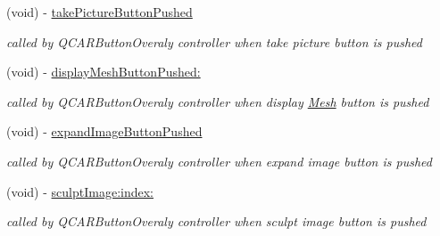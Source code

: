 \begin{DoxyCompactItemize}
\item 
\hypertarget{interface_q_c_a_r_view_controller_a5c1af65246b760a45b54d40fc888d302}{
(void) -\/ \hyperlink{interface_q_c_a_r_view_controller_a5c1af65246b760a45b54d40fc888d302}{take\-Picture\-Button\-Pushed}}
\label{interface_q_c_a_r_view_controller_a5c1af65246b760a45b54d40fc888d302}

\begin{DoxyCompactList}\small\item\em called by \-Q\-C\-A\-R\-Button\-Overaly controller when take picture button is pushed \end{DoxyCompactList}\item 
\hypertarget{interface_q_c_a_r_view_controller_a689ee8113148caf0deb078c995ac619e}{
(void) -\/ \hyperlink{interface_q_c_a_r_view_controller_a689ee8113148caf0deb078c995ac619e}{display\-Mesh\-Button\-Pushed\-:}}
\label{interface_q_c_a_r_view_controller_a689ee8113148caf0deb078c995ac619e}

\begin{DoxyCompactList}\small\item\em called by \-Q\-C\-A\-R\-Button\-Overaly controller when display \hyperlink{class_mesh}{\-Mesh} button is pushed \end{DoxyCompactList}\item 
\hypertarget{interface_q_c_a_r_view_controller_a4a666eb1ae98bee2d084c26f99b472c0}{
(void) -\/ \hyperlink{interface_q_c_a_r_view_controller_a4a666eb1ae98bee2d084c26f99b472c0}{expand\-Image\-Button\-Pushed}}
\label{interface_q_c_a_r_view_controller_a4a666eb1ae98bee2d084c26f99b472c0}

\begin{DoxyCompactList}\small\item\em called by \-Q\-C\-A\-R\-Button\-Overaly controller when expand image button is pushed \end{DoxyCompactList}\item 
\hypertarget{interface_q_c_a_r_view_controller_a96c21b9430a971678974dd10fa0be81d}{
(void) -\/ \hyperlink{interface_q_c_a_r_view_controller_a96c21b9430a971678974dd10fa0be81d}{sculpt\-Image\-:index\-:}}
\label{interface_q_c_a_r_view_controller_a96c21b9430a971678974dd10fa0be81d}

\begin{DoxyCompactList}\small\item\em called by \-Q\-C\-A\-R\-Button\-Overaly controller when sculpt image button is pushed \end{DoxyCompactList}\end{DoxyCompactItemize}
